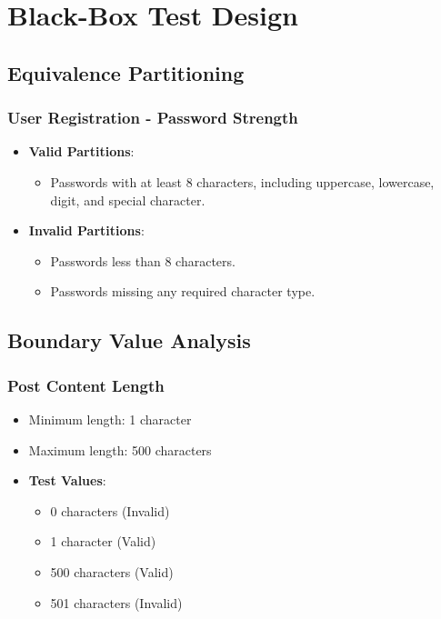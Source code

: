 \documentclass[12pt,a4paper]{report}
\begin{document}
\chapter{Black-Box Test Design}
\section{Equivalence Partitioning}
\subsection{User Registration - Password Strength}
\begin{itemize}
    \item \textbf{Valid Partitions}:
    \begin{itemize}
        \item Passwords with at least 8 characters, including uppercase, lowercase, digit, and special character.
    \end{itemize}
    \item \textbf{Invalid Partitions}:
    \begin{itemize}
        \item Passwords less than 8 characters.
        \item Passwords missing any required character type.
    \end{itemize}
\end{itemize}

\section{Boundary Value Analysis}
\subsection{Post Content Length}
\begin{itemize}
    \item Minimum length: 1 character
    \item Maximum length: 500 characters
    \item \textbf{Test Values}:
    \begin{itemize}
        \item 0 characters (Invalid)
        \item 1 character (Valid)
        \item 500 characters (Valid)
        \item 501 characters (Invalid)
    \end{itemize}
\end{itemize}
\end{document}
